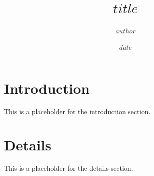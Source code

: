\documentclass[12pt]{article}
\title{$title$}
\author{$author$}
\date{$date$}
\begin{document}
\maketitle
\newpage

\tableofcontents
\newpage

\section{Introduction}
This is a placeholder for the introduction section.

\section{Details}
This is a placeholder for the details section.
\end{document}
